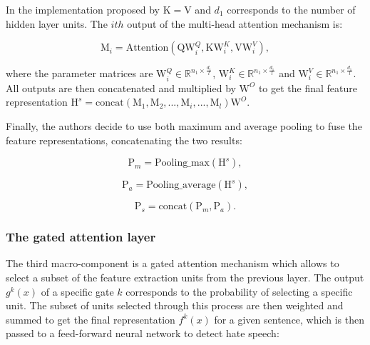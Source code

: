     In the implementation proposed by \citeauthor{original:zhou} $\mathrm{K = V}$ and $d_1$ corresponds to the number of hidden layer units. The $ith$ output of the multi-head attention mechanism is: 
    
    \begin{equation}
        \mathrm{M}_i = \mathrm{Attention}(\mathrm{QW}^{Q}_{i},\mathrm{KW}^{K}_i,\mathrm{VW}^{V}_i),
    \end{equation}
    
    where the parameter matrices are $\mathrm{W}^{Q}_{i} \in \mathbb{R}^{n_1 \times \frac{d_1}{l}}$, $\mathrm{W}^{K}_{i} \in \mathbb{R}^{n_1 \times \frac{d_1}{l}}$ and $\mathrm{W}^{V}_{i} \in \mathbb{R}^{n_1 \times \frac{d_1}{l}}$. All outputs are then concatenated and multiplied by $\mathrm{W}^{O}$ to get the final feature representation $\mathrm{H}^s = \mathrm{concat}(\mathrm{M}_1, \mathrm{M}_2, ..., \mathrm{M}_i, ..., \mathrm{M}_l)\mathrm{W}^O$.
    
    Finally, the authors decide to use both maximum and average pooling \cite{shen2018} to fuse the feature representations, concatenating the two results:
    
    \begin{equation}
        \mathrm{P}_m = \mathrm{Pooling\_max}(\mathrm{H}^s),
    \end{equation}
    
    \begin{equation}
        \mathrm{P}_a = \mathrm{Pooling\_average}(\mathrm{H}^s),
    \end{equation}
    
    \begin{equation}
        \mathrm{P}_s = \mathrm{concat}(\mathrm{P}_m, \mathrm{P}_a).
    \end{equation}


\subsubsection{The gated attention layer}
    The third macro-component is a gated attention mechanism which allows to select a subset of the feature extraction units from the previous layer. The output $g^k(x)$ of a specific gate $k$ corresponds to the probability of selecting a specific unit. The subset of units selected through this process are then weighted and summed to get the final representation $f^k(x)$ for a given sentence, which is then passed to a feed-forward neural network to detect hate speech:
    
